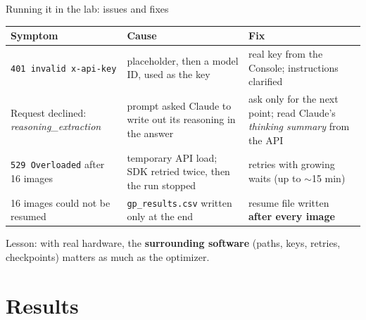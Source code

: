 \documentclass[aspectratio=169,10pt]{beamer}
\begin{document}
\begin{frame}{Running it in the lab: issues and fixes}
  \small
  \begin{tabular}{p{}p{}p{}}
    \toprule
    Symptom & Cause & Fix \\
    \midrule
    \texttt{401 invalid x-api-key} & placeholder, then a model ID, used as the key &
      real key from the Console; instructions clarified \\[1mm]
    Request declined: \emph{reasoning\_extraction} &
      prompt asked Claude to write out its reasoning in the answer &
      ask only for the next point; read Claude's \emph{thinking summary} from the API \\[1mm]
    \texttt{529 Overloaded} after 16 images &
      temporary API load; SDK retried twice, then the run stopped &
      retries with growing waits (up to $\sim$15 min) \\[1mm]
    16 images could not be resumed & \texttt{gp\_results.csv} written only at the end &
      resume file written \textbf{after every image} \\
    \bottomrule
  \end{tabular}

  \vspace{3mm}
  Lesson: with real hardware, the \textbf{surrounding software} (paths, keys,
  retries, checkpoints) matters as much as the optimizer.
\end{frame}

\section{Results}
\end{document}
